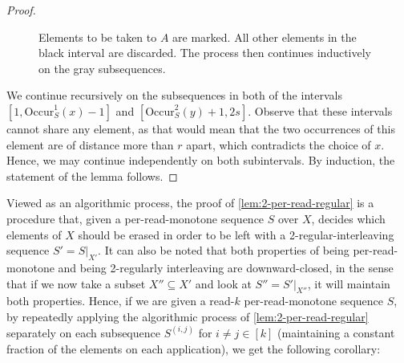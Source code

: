 \documentclass[11pt]{article}
\newcommand{\occur}[3]{\mathrm{Occur}_{#1}^{#2}({#3})}
\begin{document}
\begin{proof}
\begin{figure}[h]
\begin{center}
\caption{Elements to be taken to $A$ are marked. All other elements in the black interval are discarded. The process then continues inductively on the gray subsequences.}
\label{fig:2-per-read-proof}
\end{center}
\end{figure}

We continue recursively on the subsequences in both of the intervals $[1,\occur{S}{1}{x} - 1]$ and $[\occur{S}{2}{y} + 1, 2s]$. Observe that these intervals cannot share any element, as that would mean that the two occurrences of this element are of distance more than $r$ apart, which contradicts the choice of $x$. Hence, we may continue independently on both subintervals. By induction, the statement of the lemma follows.
\end{proof}

Viewed as an algorithmic process, the proof of \autoref{lem:2-per-read-regular} is a procedure that, given a per-read-monotone sequence $S$ over $X$, decides which elements of $X$ should be erased in order to be left with a 2-regular-interleaving sequence $S'=S|_{X'}$. It can also be noted that both properties of being per-read-monotone and being 2-regularly interleaving are downward-closed, in the sense that if we now take a subset $X'' \subseteq X'$ and look at $S''=S'|_{X''}$, it will maintain both properties. Hence, if we are given a read-$k$ per-read-monotone sequence $S$, by repeatedly applying the algorithmic process of \autoref{lem:2-per-read-regular} separately on each subsequence $S^{(i,j)}$ for $i\neq j \in [k]$ (maintaining a constant fraction of the elements on each application), we get the following corollary:
\end{document}
